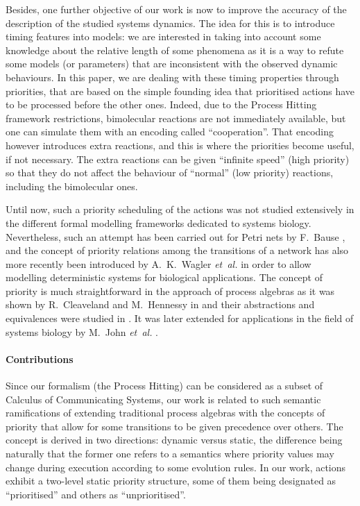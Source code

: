 Besides, one further objective of our work is now %
to improve the accuracy of the description of the studied systems dynamics.
The idea for this is to introduce timing features into models:
we are interested in taking into account some knowledge about the relative length of some phenomena as it is a way to refute some models (or parameters) that are inconsistent with the observed dynamic behaviours.
In this paper, we are dealing with these timing properties through priorities,
that are based on the simple founding idea that prioritised actions have to be processed before the other ones.
Indeed, due to the Process Hitting framework restrictions, bimolecular reactions are not immediately available, but one can simulate them with an encoding called “cooperation”.
That encoding however introduces extra reactions, and this is where the priorities become useful, if not necessary.
The extra reactions can be given “infinite speed” (high priority) so that they do not affect the behaviour of “normal” (low priority) reactions, including the bimolecular ones.

Until now, such a priority scheduling of the actions was not studied extensively in the different formal modelling frameworks dedicated to systems biology.
Nevertheless, such an attempt has been carried out for Petri nets by F.~Bause \cite{Bause97},
and the concept of priority relations among the transitions of a network has also more recently been introduced by A.~K.~Wagler \textit{et~al.} \cite{waw,WaglerW12} in order to allow modelling deterministic systems for biological applications.
The concept of priority is much straightforward in the approach of process algebras as it was shown by R.~Cleaveland and M.~Hennessy in \cite{Cleaveland199058,Cleaveland99prioritiesin} and their abstractions and equivalences were studied in \cite{Cleaveland:2007:PAP:1282576.1282847}.
It was later extended for applications in the field of systems biology by M.~John \textit{et~al.} \cite{jlnu2010}.

\paragraph{Contributions}
Since our formalism (the Process Hitting) can be considered as a subset of Calculus of Communicating Systems, %
our work is related to such semantic ramifications of extending traditional process algebras with the concepts of priority that allow for some transitions to be given precedence over others.
The concept is derived in two directions: dynamic versus static, the difference being naturally that the former one refers to a semantics where priority values may change during execution according to some evolution rules.
In our work, actions exhibit a two-level static priority structure, some of them being designated as “prioritised” and others as “unprioritised”.

